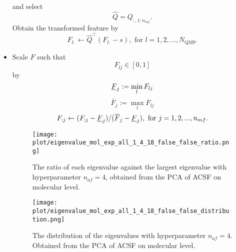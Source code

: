 \documentclass[12pt]{article}
\begin{document}
\begin{itemize}
\begin{equation}
		\end{equation}
		and select
		\begin{equation}
			\hat{Q} = Q_{:, 1:n_{mf}}.
		\end{equation}
		Obtain the transformed feature by
		\begin{equation}
			\label{eq:pca_mol_end}
			F_{l:} \leftarrow \hat{Q}^\top(F_{l:} - s), \text{ for }l = 1,2,...,N_\text{QM9}.
		\end{equation}
	\item Scale $F$ such that 
	\begin{equation}
		\label{eq:scale_mol_1}
		F_{lj} \in [0, 1]
	\end{equation}
	by
	\begin{equation}
		\label{eq:scale_mol_2}
		\underbar{$F$}_{j} := \min_{l} F_{lj}
	\end{equation}
	\begin{equation}
		\overline{F}_{j} := \max_{l} F_{lj}
	\end{equation}
	\begin{equation}
		F_{:j} \leftarrow (F_{:j} - \underbar{$F$}_{j})/ (\overline{F}_{j} - \underbar{$F$}_{j}), \text{ for } j = 1,2,..., n_{mf}.
	\end{equation}
	\begin{figure}[h]
		\label{fig:PCA_mol_rat}
		\centering
		\texttt{[image: plot/eigenvalue\_mol\_exp\_all\_1\_4\_18\_false\_false\_ratio.png]}
		\caption{The ratio of each eigenvalue against the largest eigenvalue with hyperparameter $n_{af} = 4$, obtained from the PCA of ACSF on molecular level.}
	\end{figure}
	\begin{figure}[H]
		\label{fig:PCA_mol_dist}
		\centering
		\texttt{[image: plot/eigenvalue\_mol\_exp\_all\_1\_4\_18\_false\_false\_distribution.png]}
		\caption{The distribution of the eigenvalues with hyperparameter $n_{af} = 4$. Obtained from the PCA of ACSF on molecular level.}
	\end{figure}
\end{itemize}
\end{document}
